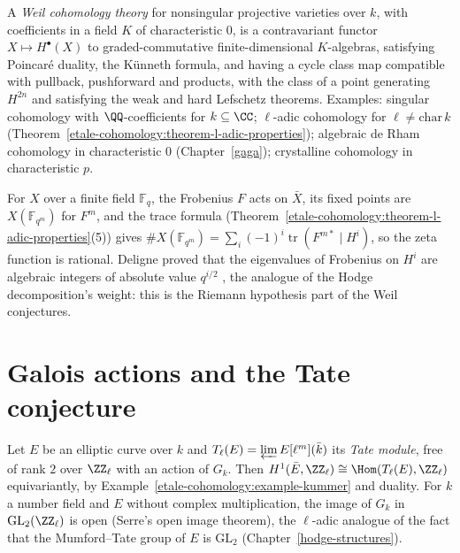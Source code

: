\begin{definition}\label{etale-cohomology:definition-weil-cohomology}
A \emph{Weil cohomology theory} for nonsingular projective varieties over $k$, with coefficients in a field $K$ of characteristic $0$, is a contravariant functor
$X \mapsto H^\bullet(X)$ to graded-commutative finite-dimensional $K$-algebras, satisfying Poincar\'e duality, the K\"unneth formula, and having a cycle class map compatible with pullback,
pushforward and products, with the class of a point generating $H^{2n}$ and satisfying the weak and hard Lefschetz theorems. Examples: singular cohomology with $\QQ$-coefficients for
$k \subseteq \CC$; $\ell$-adic cohomology for $\ell \neq \mathrm{char}\,k$ (Theorem~\ref{etale-cohomology:theorem-l-adic-properties}); algebraic de Rham cohomology in characteristic $0$
(Chapter~\ref{gaga}); crystalline cohomology in characteristic $p$.
\end{definition}

\begin{remark}\label{etale-cohomology:remark-weil-conjectures}
For $X$ over a finite field $\mathbb{F}_q$, the Frobenius $F$ acts on $\bar X$, its fixed points are $X(\mathbb{F}_{q^m})$ for $F^m$, and the trace formula
(Theorem~\ref{etale-cohomology:theorem-l-adic-properties}(5)) gives $\#X(\mathbb{F}_{q^m}) = \sum_i(-1)^i\operatorname{tr}(F^{m*} \mid H^i)$, so the zeta function is rational. Deligne proved that the
eigenvalues of Frobenius on $H^i$ are algebraic integers of absolute value $q^{i/2}$ \cite{deligne-weil-1}, the analogue of the Hodge decomposition's weight: this is the
Riemann hypothesis part of the Weil conjectures.
\end{remark}

\section{Galois actions and the Tate conjecture}\label{etale-cohomology:section-galois}

\begin{example}\label{etale-cohomology:example-tate-module}
Let $E$ be an elliptic curve over $k$ and $T_\ell(E) = \varprojlim E[\ell^m](\bar k)$ its \emph{Tate module}, free of rank $2$ over $\ZZ_\ell$ with an action of $G_k$. Then
$H^1(\bar E, \ZZ_\ell) \cong \Hom(T_\ell(E), \ZZ_\ell)$ equivariantly, by Example~\ref{etale-cohomology:example-kummer} and duality. For $k$ a number field and $E$ without complex
multiplication, the image of $G_k$ in $\mathrm{GL}_2(\ZZ_\ell)$ is open (Serre's open image theorem), the $\ell$-adic analogue of the fact that the Mumford--Tate group of $E$ is
$\mathrm{GL}_2$ (Chapter~\ref{hodge-structures}).
\end{example}

